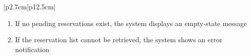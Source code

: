 \begin{table}[H]
\begin{tabular}{|p{2.7cm}|p{12.5cm}|}
\begin{minipage}[t]{\linewidth}
\begin{enumerate}[topsep=0pt,itemsep=1pt,parsep=0pt,partopsep=0pt]
                                          \item If no pending reservations exist, the system displays an empty-state message
                                          \item If the reservation list cannot be retrieved, the system shows an error
                                                notification
                                      \end{enumerate}
                                  \end{minipage}      \\
        \hline
    \end{tabular}
    \label{tab:admin-view-pending-camera-reservations}
\end{table}
